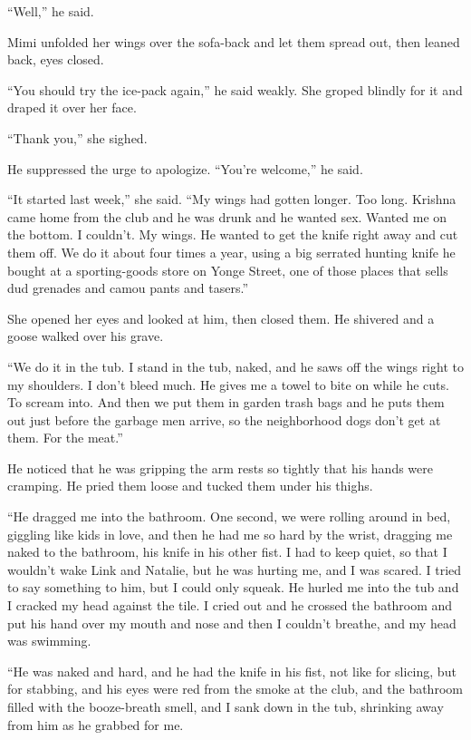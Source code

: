 ``Well,'' he said.

Mimi unfolded her wings over the sofa-back and let them spread out,
then leaned back, eyes closed.

``You should try the ice-pack again,'' he said weakly.  She groped
blindly for it and draped it over her face.

``Thank you,'' she sighed.

He suppressed the urge to apologize.  ``You're welcome,'' he said.

``It started last week,'' she said.  ``My wings had gotten longer. 
Too long.  Krishna came home from the club and he was drunk and he
wanted sex.  Wanted me on the bottom.  I couldn't.  My wings.  He
wanted to get the knife right away and cut them off.  We do it about
four times a year, using a big serrated hunting knife he bought at a
sporting-goods store on Yonge Street, one of those places that sells
dud grenades and camou pants and tasers.''

She opened her eyes and looked at him, then closed them.  He shivered
and a goose walked over his grave.

``We do it in the tub.  I stand in the tub, naked, and he saws off the
wings right to my shoulders.  I don't bleed much.  He gives me a towel
to bite on while he cuts.  To scream into.  And then we put them in
garden trash bags and he puts them out just before the garbage men
arrive, so the neighborhood dogs don't get at them.  For the meat.''

He noticed that he was gripping the arm rests so tightly that his
hands were cramping.  He pried them loose and tucked them under his
thighs.

``He dragged me into the bathroom.  One second, we were rolling around
in bed, giggling like kids in love, and then he had me so hard by the
wrist, dragging me naked to the bathroom, his knife in his other fist. 
I had to keep quiet, so that I wouldn't wake Link and Natalie, but he
was hurting me, and I was scared.  I tried to say something to him,
but I could only squeak.  He hurled me into the tub and I cracked my
head against the tile.  I cried out and he crossed the bathroom and
put his hand over my mouth and nose and then I couldn't breathe, and
my head was swimming.

``He was naked and hard, and he had the knife in his fist, not like
for slicing, but for stabbing, and his eyes were red from the smoke at
the club, and the bathroom filled with the booze-breath smell, and I
sank down in the tub, shrinking away from him as he grabbed for me.

